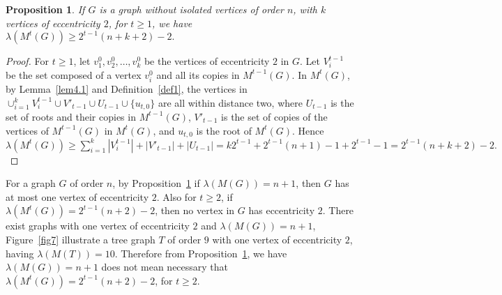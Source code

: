 \documentclass{article}
\newtheorem{prop} {Proposition}
\newtheorem{open problem} {Open Problem}
\numberwithin{lemma}{section}
\numberwithin{theorem}{section}
\numberwithin{cor}{section}
\numberwithin{prop}{section}
\numberwithin{con}{section}
\numberwithin{claim}{section}
\numberwithin{obs}{section}
\numberwithin{dnt}{section}
\begin{document}
\begin{prop}\label{prop4.1}
	If $G$ is a graph without isolated vertices of order $n$, with $k$ vertices of eccentricity $2$, for $t\geq 1$, we have $\lambda(M^t(G))\geq 2^{t-1}(n+k+2)-2.$
\end{prop}
\begin{proof}
	For $t\geq 1$, let $v^0_1,v^0_2,\ldots,v^0_k$ be the vertices of eccentricity $2$ in $G$. Let $V^{t-1}_i$ be the set composed of a vertex $v^0_i$ and all its copies in $M^{t-1}(G)$. In $M^t(G)$, by Lemma~\ref{lem4.1} and Definition~\ref{def1}, the vertices in $\cup_{i=1}^{k}V^{t-1}_i\cup V'_{t-1}\cup U_{t-1}\cup \{u_{t,0}\} $ are all within distance two, where $U_{t-1}$ is the set of roots and their copies in $M^{t-1}(G)$, $V'_{t-1}$ is the set of copies of the vertices of $M^{t-1}(G)$ in $M^t(G) $, and $u_{t,0}$ is the root of $M^t(G)$. Hence $\lambda(M^t(G))\geq\sum_{i=1}^{k}|V^{t-1}_i|+ |V'_{t-1}|+|U_{t-1}|=k2^{t-1}+2^{t-1}(n+1)-1+2^{t-1}-1= 2^{t-1}(n+k+2)-2.$ 
\end{proof}
For a graph $G$ of order $n$, by Proposition~\ref{prop4.1} if $\lambda(M(G))=n+1$, then $G$ has at most one vertex of eccentricity $2$. Also for $t\geq 2$, if $\lambda(M^t(G))=2^{t-1}(n+2)-2$, then no vertex in $G$ has eccentricity $2$. There exist graphs with one vertex of eccentricity $2$ and $\lambda(M(G))=n+1$,  Figure~\ref{fig7} illustrate a tree graph $T$ of order $9$ with one vertex of eccentricity $2$,  having $\lambda(M(T))=10$. Therefore from Proposition~\ref{prop4.1}, we have $\lambda(M(G))=n+1$ does not mean necessary that $\lambda(M^t(G))=2^{t-1}(n+2)-2$, for $t\geq 2$.
\end{document}
